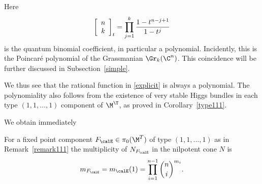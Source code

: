 \begin{remark}
	Here  $$\left[\begin{array}{c} n \\ k \end{array}\right]_t=\prod_{j=1}^k{1-t^{n-j+1} \over 1-t^j }$$ is the quantum binomial coefficient, in particular a polynomial. Incidently, this is the Poincar\'e polynomial of the Grassmanian $\Gr_k(\C^n)$. This coincidence will be further discussed in Subsection~\ref{simple}.

	We thus see that the rational function in \eqref{explicit} is always a polynomial. The polynomiality also follows from the existence of very stable Higgs bundles in each type $(1,1,\dots,1)$  component of $\M^\T$, as proved in Corollary~\ref{type111}.
\end{remark}

We obtain immediately
\begin{corollary}
\notready \label{mult111} For a fixed point component $F_\calE\in \pi_0(\M^T)$  of type $(1,1,...,1)$ as in Remark~\ref{remark111} the multiplicity of $N_{F_\calE}$ in the nilpotent cone $N$ is $$m_{F_\calE}=m_\calE(1)=\prod_{i=1}^{n-1} %
	{n \choose i}^{m_i}.$$
\end{corollary}

